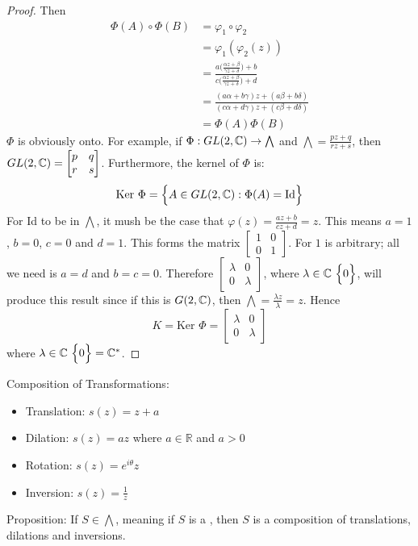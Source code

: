 \documentclass[12pt]{article}
\begin{document}
\begin{proof}
Then $$ \begin{aligned} \Phi(A) \circ \Phi(B) &= \varphi_1 \circ \varphi_2 \\ &= \varphi_1(\varphi_2(z)) \\ &= \frac{a\Big( \frac{\alpha z + \beta}{\gamma z + \delta} \Big) + b}{c \Big( \frac{\alpha z + \beta}{\gamma z + \delta} \Big) + d} \\ &= \frac{(a\alpha + b\gamma)z + (a\beta + b\delta)}{(c\alpha + d\gamma)z + (c\beta + d\delta)} \\ &= \Phi(A)\Phi(B) \end{aligned} $$
$\Phi$ is obviously onto. For example, if $\Phi: GL(2,\mathbb{C}) \to \bigwedge$ and $\bigwedge = \frac{pz+q}{rz+s}$, then $GL(2,\mathbb{C}) = \begin{bmatrix} p & q \\ r & s \end{bmatrix}$. Furthermore, the kernel of $\Phi$ is: 
$$ \text{Ker } \Phi = \Big\{ A \in GL(2,\mathbb{C}): \Phi(A) = \text{Id} \Big\}$$ For Id to be in $\bigwedge$, it mush be the case that $\varphi(z) = \frac{az+b}{cz+d} = z$. This means $a=1$, $b=0$, $c=0$ and $d=1$. This forms the matrix $\begin{bmatrix} 1 & 0 \\ 0 & 1 \end{bmatrix}$. For $1$ is arbitrary; all we need is $a = d$ and $b = c = 0$. Therefore $\begin{bmatrix} \lambda & 0 \\ 0 & \lambda \end{bmatrix} $, where $\lambda \in \mathbb{C} \ \Big\{ 0 \Big\}$, will produce this result since if this is $G(2,\mathbb{C})$, then $\bigwedge = \frac{\lambda z}{\lambda} = z$. Hence 
$$K = \text{Ker } \Phi = \begin{bmatrix} \lambda & 0 \\ 0 & \lambda \end{bmatrix}$$ where $\lambda \in \mathbb{C} \ \Big\{ 0 \Big\} = \mathbb{C}^*$. \end{proof} 
Composition of Transformations: \begin{itemize} 
\item Translation: $s(z) = z+a$ 
\item Dilation: $s(z) = az$ where $a \in \mathbb{R}$ and $a > 0$ 
\item Rotation: $s(z) = e^{i\theta}z$
\item Inversion: $s(z) = \frac{1}{z}$ \end{itemize} 
Proposition: If $S \in \bigwedge$, meaning if $S$ is a \mobt, then $S$ is a composition of translations, dilations and inversions.
\end{document}
